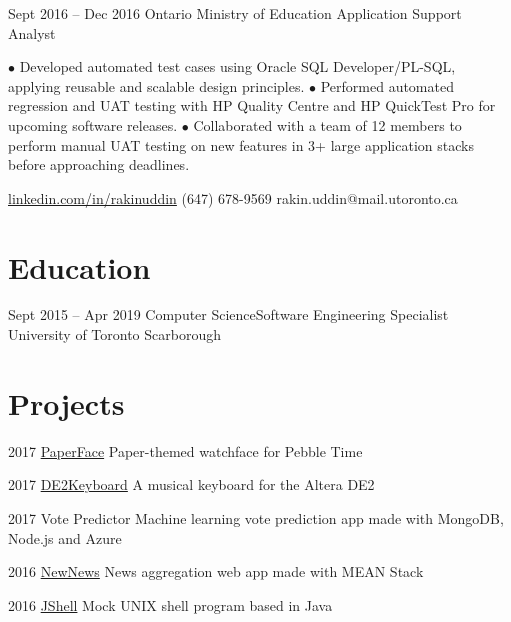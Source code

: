 \documentclass[fontsize=10pt]{tccv}
\begin{document}
\begin{eventlist}
		\item{Sept 2016 -- Dec 2016}
		{Ontario Ministry of Education}
		{Application Support Analyst}
		
		$\bullet$ Developed automated test cases using Oracle SQL Developer/PL-SQL, applying reusable and scalable design principles.\newline
		$\bullet$ Performed automated regression and UAT testing with HP Quality Centre and HP QuickTest Pro for upcoming software releases.\newline
		$\bullet$ Collaborated with a team of 12 members to perform manual UAT testing on new features in 3+ large application stacks before approaching deadlines.
		
	\end{eventlist}
	
	\personal
	{\href{https://www.linkedin.com/in/rakinuddin/}{linkedin.com/in/rakinuddin}}
	{(647) 678-9569}
	{rakin.uddin@mail.utoronto.ca}
	
	\section{Education}
	
	\begin{yearlist}
		
		\item{Sept 2015 -- Apr 2019}
		{Computer Science\newline Software Engineering Specialist}
		{University of Toronto Scarborough}
		
	\end{yearlist}
	
	\section{Projects}
	
	\begin{yearlist}
		
		\item{2017}
		{\href{https://github.com/ItsMeWithTheFace/PaperFace}{PaperFace}}
		{Paper-themed watchface for Pebble Time}
		
		\item{2017}
		{\href{https://github.com/ItsMeWithTheFace/DE2Keyboard}{DE2Keyboard}}
		{A musical keyboard for the Altera DE2}
		
		\item{2017}
		{Vote Predictor}
		{Machine learning vote prediction app made with MongoDB, Node.js and Azure}
		
		\item{2016}
		{\href{https://github.com/ItsMeWithTheFace/NewNews}{NewNews}}
		{News aggregation web app made with MEAN Stack}
		
		\item{2016}
		{\href{https://github.com/ItsMeWithTheFace/JShell}{JShell}}
		{Mock UNIX shell program based in Java}
		
	\end{yearlist}
	
\end{document}

